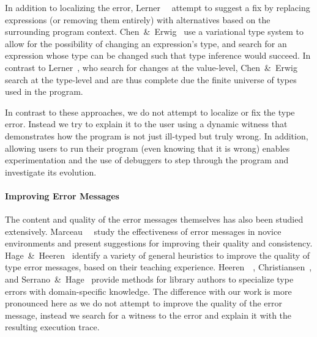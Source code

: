 In addition to localizing the error, Lerner~\etal~ attempt to
suggest a fix by replacing expressions (or removing them entirely) with
alternatives based on the surrounding program context.
%
Chen~\&~Erwig~ use a variational type system to allow for the
possibility of changing an expression's type, and search for an
expression whose type can be changed such that type inference would
succeed.
%
%
In contrast to Lerner~\etal, who search for changes at the value-level,
Chen~\&~Erwig search at the type-level and are thus complete due the finite
universe of types used in the program.
%
%

In contrast to these approaches, we do not attempt to localize or fix
the type error. Instead we try to explain it to the user using a
dynamic witness that demonstrates how the program is not just
ill-typed but truly wrong. In addition, allowing users to run their
program (even knowing that it is wrong)
enables experimentation and the
use of debuggers to step through the program and investigate its
evolution.

\paragraph{Improving Error Messages}
%
The content and quality of the error messages themselves has also been
studied extensively.
%
Marceau~\etal~ study the effectiveness of error
messages in novice environments and present suggestions for improving
their quality and consistency.
%
Hage~\&~Heeren~ identify a variety of general heuristics to improve
the quality of type error messages, based on their teaching experience.
%
Heeren~\etal~,
Christiansen~, and
Serrano~\&~Hage~
provide methods for library authors to specialize
type errors with domain-specific knowledge.
%
The difference with our work is more pronounced here as we do not
attempt to improve the quality of the error message, instead we search
for a witness to the error and explain it with the resulting execution
trace.
%



